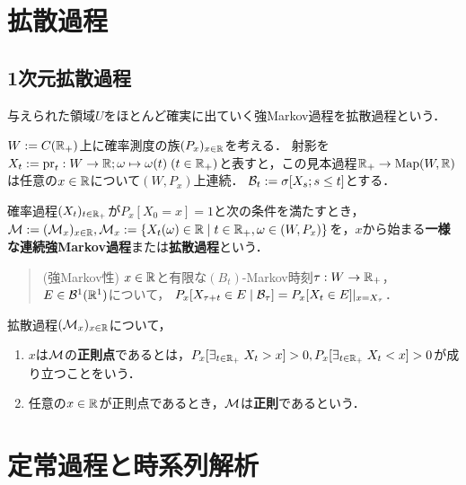 \documentclass[uplatex,dvipdfmx]{jsreport}
\begin{document}
\chapter{拡散過程}

\section{1次元拡散過程}

\begin{tcolorbox}[colframe=ForestGreen, colback=ForestGreen!10!white,breakable,colbacktitle=ForestGreen!40!white,coltitle=black,fonttitle=\bfseries\sffamily,
title=]
    与えられた領域$U$をほとんど確実に出ていく強Markov過程を拡散過程という．
\end{tcolorbox}

\begin{notation}
    $W:=C(\mathbb{R}_+)$上に確率測度の族$(P_x)_{x\in\mathbb{R}}$を考える．
    射影を$X_t:=\mathrm{pr}_t:W\to\mathbb{R};\omega\mapsto\omega(t)\;(t\in\mathbb{R}_+)$と表すと，この見本過程$\mathbb{R}_+\to\mathrm{Map}(W,\mathbb{R})$は任意の$x\in\mathbb{R}$について$(W,P_x)$上連続．
    $\mathcal{B}_t:=\sigma[X_s;s\le t]$とする．
\end{notation}

\begin{definition}
    確率過程$(X_t)_{t\in\mathbb{R}_+}$が$P_x[X_0=x]=1$と次の条件を満たすとき，$\mathcal{M}:=(\mathcal{M}_x)_{x\in\mathbb{R}},\mathcal{M}_x:=\left\{X_t(\omega)\in\mathbb{R}\mid t\in\mathbb{R}_+,\omega\in(W,P_x)\right\}$を，$x$から始まる\textbf{一様な連続強Markov過程}または\textbf{拡散過程}という．
    \begin{quote}
        (強Markov性) $x\in\mathbb{R}$と有限な$(B_t)$-Markov時刻$\tau:W\to\mathbb{R}_+$，$E\in\mathcal{B}^1(\mathbb{R}^1)$について，
        $P_x[X_{\tau+t}\in E\mid\mathcal{B}_\tau]=P_x[X_t\in E]|_{x=X_\tau}$．
    \end{quote}
\end{definition}

\begin{definition}
    拡散過程$(\mathcal{M}_x)_{x\in\mathbb{R}}$について，
    \begin{enumerate}
        \item $x$は$\mathcal{M}$の\textbf{正則点}であるとは，$P_x[\exists_{t\in\mathbb{R}_+}\;X_t>x]>0,P_x[\exists_{t\in\mathbb{R}_+}\;X_t<x]>0$が成り立つことをいう．
        \item 任意の$x\in\mathbb{R}$が正則点であるとき，$\mathcal{M}$は\textbf{正則}であるという．
    \end{enumerate}
\end{definition}

\chapter{定常過程と時系列解析}
\end{document}
